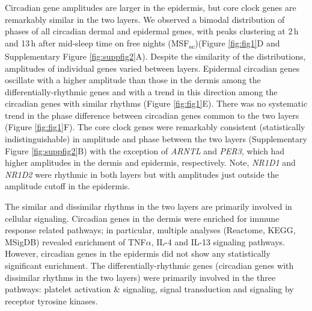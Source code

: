 Circadian gene amplitudes are larger in the epidermis, but core clock genes are remarkably similar in the two layers. We observed a bimodal distribution of phases of all circadian dermal and epidermal genes, with peaks clustering at 2\,h and 13\,h after mid-sleep time on free nights (MSF\textsubscript{sc})(Figure \ref{fig:fig1}D and Supplementary Figure \ref{fig:suppfig2}A). Despite the similarity of the distributions, amplitudes of individual genes varied between layers. Epidermal circadian genes oscillate with a higher amplitude than those in the dermis among the differentially-rhythmic genes and with a trend in this direction among the circadian genes with similar rhythms (Figure \ref{fig:fig1}E). There was no systematic trend in the phase difference between circadian genes common to the two layers (Figure \ref{fig:fig1}F). The core clock genes were remarkably consistent (statistically indistinguishable) in amplitude and phase between the two layers (Supplementary Figure \ref{fig:suppfig2}B) with the exception of \textit{ARNTL} and \textit{PER3}, which had higher amplitudes in the dermis and epidermis, respectively. Note, \textit{NR1D1} and \textit{NR1D2} were rhythmic in both layers but with amplitudes just outside the amplitude cutoff in the epidermis.

The similar and dissimilar rhythms in the two layers are primarily involved in cellular signaling. Circadian genes in the dermis were enriched for immune response related pathways; in particular, multiple analyses (Reactome, KEGG, MSigDB) revealed enrichment of TNF$\alpha$, IL-4 and IL-13 signaling pathways. However, circadian genes in the epidermis did not show any statistically significant enrichment. The differentially-rhythmic genes (circadian genes with dissimilar rhythms in the two layers) were primarily involved in the three pathways: platelet activation \& signaling, signal transduction and signaling by receptor tyrosine kinases.


